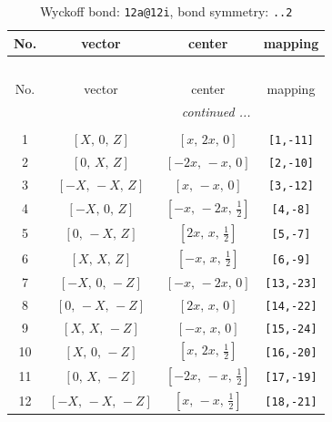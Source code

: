 \documentclass[fleqn,8pt]{jsarticle}
\begin{document}
\begin{longtable}{cccc}
\caption{Wyckoff bond: {\tt 12a@12i}, bond symmetry: {\tt ..2}}
 \\
 \hline \hline
No. & vector & center & mapping \\ \hline \endfirsthead

\multicolumn{3}{l}{\tablename\ \thetable{}} \\
 \hline \hline
No. & vector & center & mapping \\ \hline \endhead

 \hline \hline
\multicolumn{3}{r}{\footnotesize\it continued ...} \\ \endfoot

 \hline \hline
\multicolumn{3}{r}{} \\ \endlastfoot

1 & $\left[ X,\, 0,\, Z \right]$ & $\left[ x,\, 2 x,\, 0 \right]$ & {\tt [1,-11]} \\ \hline
2 & $\left[ 0,\, X,\, Z \right]$ & $\left[ - 2 x,\, - x,\, 0 \right]$ & {\tt [2,-10]} \\ \hline
3 & $\left[ - X,\, - X,\, Z \right]$ & $\left[ x,\, - x,\, 0 \right]$ & {\tt [3,-12]} \\ \hline
4 & $\left[ - X,\, 0,\, Z \right]$ & $\left[ - x,\, - 2 x,\, \frac{1}{2} \right]$ & {\tt [4,-8]} \\ \hline
5 & $\left[ 0,\, - X,\, Z \right]$ & $\left[ 2 x,\, x,\, \frac{1}{2} \right]$ & {\tt [5,-7]} \\ \hline
6 & $\left[ X,\, X,\, Z \right]$ & $\left[ - x,\, x,\, \frac{1}{2} \right]$ & {\tt [6,-9]} \\ \hline
7 & $\left[ - X,\, 0,\, - Z \right]$ & $\left[ - x,\, - 2 x,\, 0 \right]$ & {\tt [13,-23]} \\ \hline
8 & $\left[ 0,\, - X,\, - Z \right]$ & $\left[ 2 x,\, x,\, 0 \right]$ & {\tt [14,-22]} \\ \hline
9 & $\left[ X,\, X,\, - Z \right]$ & $\left[ - x,\, x,\, 0 \right]$ & {\tt [15,-24]} \\ \hline
10 & $\left[ X,\, 0,\, - Z \right]$ & $\left[ x,\, 2 x,\, \frac{1}{2} \right]$ & {\tt [16,-20]} \\ \hline
11 & $\left[ 0,\, X,\, - Z \right]$ & $\left[ - 2 x,\, - x,\, \frac{1}{2} \right]$ & {\tt [17,-19]} \\ \hline
12 & $\left[ - X,\, - X,\, - Z \right]$ & $\left[ x,\, - x,\, \frac{1}{2} \right]$ & {\tt [18,-21]} \\
\end{longtable}
\renewcommand{\arraystretch}{1.2}
\end{document}
